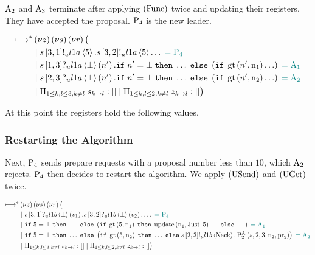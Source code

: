 $\operatorname{A_{2}}$ and $\operatorname{A_{3}}$ terminate after applying $\left(\operatorname{Func}\right)$ twice and updating their registers.
They have accepted the proposal.
$\operatorname{P_{4}}$ is the new leader.

\begin{align*}
\longmapsto^*&\left(\nu z\right)\left(\nu s\right)\left(\nu r\right)\big (\\
&\; | \;
s\left[3, 1\right]!_u l1a \left\langle 5 \right\rangle.
s\left[3, 2\right]!_u l1a \left\langle 5 \right\rangle\ldots
\;\textcolor{teal}{= \operatorname{P_{4}}}\\
&\; | \;
    s\left[1, 3\right]?_u l1a \left\langle \bot \right\rangle \left(n'\right).
    \mathtt{if}\; n' = \bot
    \;\mathtt{then}\; \ldots
    \;\mathtt{else}\; \left(
        \mathtt{if}\; \operatorname{gt}\left(n', \operatorname{n}_1\right)
        \ldots
    \right)
    \;\textcolor{teal}{= \operatorname{A_{1}}}\\
&\; | \;
    s\left[2, 3\right]?_u l1a \left\langle \bot \right\rangle \left(n'\right).
    \mathtt{if}\; n' = \bot
    \;\mathtt{then}\; \ldots
    \;\mathtt{else}\; \left(
        \mathtt{if}\; \operatorname{gt}\left(n', \operatorname{n}_2\right)
        \ldots
    \right)
    \;\textcolor{teal}{= \operatorname{A_{2}}}\\
&\; | \; \Pi_{1 \le k,l \le 3, k \neq l}\; s_{k\to l}:[]
\; | \; \Pi_{1 \le k,l \le 2, k \neq l}\; z_{k\to l}:[]
\big )
\end{align*}

At this point the registers hold the following values.


\subsubsection{Restarting the Algorithm}
Next, $\operatorname{P_{4}}$ sends prepare requests with a proposal number less than $10$, which $\operatorname{A_{2}}$ rejects.
$\operatorname{P_{4}}$ then decides to restart the algorithm.
We apply $\left(\operatorname{USend}\right)$ and $\left(\operatorname{UGet}\right)$ twice.

\begin{align*}
\longmapsto^*&\left(\nu z\right)\left(\nu s\right)\left(\nu r\right)\big (\\
&\; | \;
    s\left[3, 1\right]?_u l1b \left\langle \bot \right\rangle \left(v_1\right).
    s\left[3, 2\right]?_u l1b \left\langle \bot \right\rangle \left(v_2\right).
    \ldots
    \;\textcolor{teal}{= \operatorname{P_{4}}}\\
&\; | \;
    \mathtt{if}\; 5 = \bot
    \;\mathtt{then}\; \ldots
    \;\mathtt{else}\; \left(
        \mathtt{if}\; \operatorname{gt}\left(5, \operatorname{n}_1\right)
        \;\mathtt{then}\; \operatorname{update} \left(\operatorname{n}_1, \operatorname{Just}\; 5\right)\ldots
        \;\mathtt{else}\; \ldots
    \right)
    \;\textcolor{teal}{= \operatorname{A_{1}}}\\
&\; | \;
    \mathtt{if}\; 5 = \bot
    \;\mathtt{then}\; \ldots
    \;\mathtt{else}\; \left(
        \mathtt{if}\; \operatorname{gt}\left(5, \operatorname{n}_2\right)
        \;\mathtt{then}\; \ldots
        \;\mathtt{else}\;
            s\left[2, 3\right]!_u l1b \left\langle \operatorname{Nack} \right\rangle.
            \textstyle\operatorname{P^{A}_{2}}\left(s, 2, 3, \operatorname{n}_2, \operatorname{pr}_2\right)
    \right)
    \;\textcolor{teal}{= \operatorname{A_{2}}}\\
&\; | \; \Pi_{1 \le k,l \le 3, k \neq l}\; s_{k\to l}:[]
\; | \; \Pi_{1 \le k,l \le 2, k \neq l}\; z_{k\to l}:[]
\big )
\end{align*}

